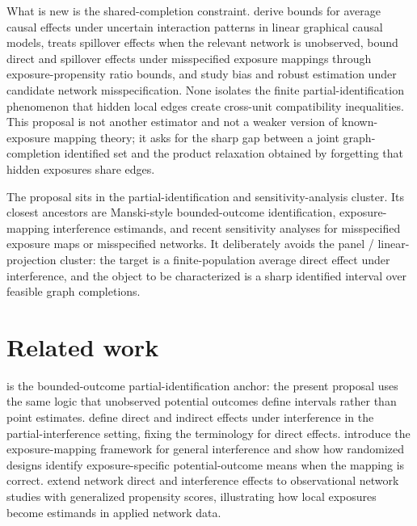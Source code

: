 \documentclass[11pt]{article}
\theoremstyle{definition}
\theoremstyle{plain}
\theoremstyle{remark}
\begin{document}
What is new is the shared-completion constraint.  \citet{ZhangMohanPearl2023} derive bounds for average causal effects under uncertain interaction patterns in linear graphical causal models, \citet{Egami2020} treats spillover effects when the relevant network is unobserved, \citet{SchroderOprescuFeuerriegelKallus2026} bound direct and spillover effects under misspecified exposure mappings through exposure-propensity ratio bounds, and \citet{WeinsteinNevo2026} study bias and robust estimation under candidate network misspecification.  None isolates the finite partial-identification phenomenon that hidden local edges create cross-unit compatibility inequalities.  This proposal is not another estimator and not a weaker version of known-exposure mapping theory; it asks for the sharp gap between a joint graph-completion identified set and the product relaxation obtained by forgetting that hidden exposures share edges.

The proposal sits in the partial-identification and sensitivity-analysis cluster.  Its closest ancestors are Manski-style bounded-outcome identification, exposure-mapping interference estimands, and recent sensitivity analyses for misspecified exposure maps or misspecified networks.  It deliberately avoids the panel / linear-projection cluster: the target is a finite-population average direct effect under interference, and the object to be characterized is a sharp identified interval over feasible graph completions.

\section{Related work}
\citet{Manski1990} is the bounded-outcome partial-identification anchor: the present proposal uses the same logic that unobserved potential outcomes define intervals rather than point estimates.  \citet{HudgensHalloran2008} define direct and indirect effects under interference in the partial-interference setting, fixing the terminology for direct effects.  \citet{AronowSamii2017} introduce the exposure-mapping framework for general interference and show how randomized designs identify exposure-specific potential-outcome means when the mapping is correct.  \citet{ForastiereAiroldiMealli2021} extend network direct and interference effects to observational network studies with generalized propensity scores, illustrating how local exposures become estimands in applied network data.
\end{document}
